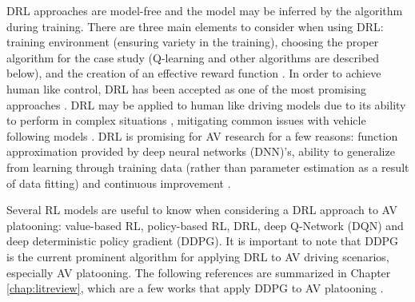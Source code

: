 DRL approaches are model-free and the model may be inferred by the algorithm during
training.  There are three main elements to consider when using DRL: training environment (ensuring
variety in the training), choosing the proper algorithm for the case study (Q-learning
and other algorithms are described below), and the creation of an effective reward
function \cite{Ye2019}.  In order to achieve human like control, DRL has been accepted
as one of the most promising approaches \cite{ElSallab2017a}.  DRL may be applied to
human like driving models due to its ability to perform in complex situations
\cite{Zhu2018}, mitigating common issues with vehicle following models \cite{Zhu2018}.
DRL is promising for AV research for a few reasons: function approximation provided
by deep neural networks (DNN)'s, ability to generalize from learning through training
data (rather than parameter estimation as a result of data fitting) and continuous
improvement \cite{Zhu2018}.

Several RL models are useful to know when considering a DRL approach
to AV platooning: value-based RL, policy-based RL, DRL, deep Q-Network (DQN) and deep deterministic
policy gradient (DDPG). It is important to note that DDPG is the current prominent algorithm
for applying DRL to AV driving scenarios, especially AV platooning. The following
references are summarized in Chapter \ref{chap:litreview}, which are a few works that apply
DDPG to AV platooning \cite{Lin2019, Song2020, Chu2019b, Peake2020}.

